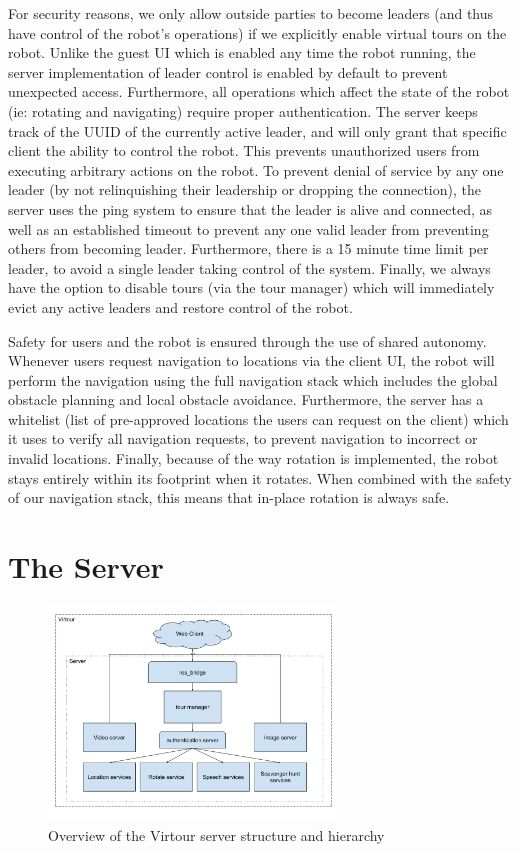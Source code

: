 \documentclass[
  oneside,
  11pt, a4paper,
  footinclude=true,
  headinclude=true,
  cleardoublepage=empty
]{article}
\begin{document}
For security reasons, we only allow outside parties to become leaders (and thus
have control of the robot's operations) if we explicitly enable virtual tours
on the robot. Unlike the guest UI which is enabled any time the robot running,
the server implementation of leader control is enabled by default to prevent
unexpected access. Furthermore, all operations which affect the state of the
robot (ie: rotating and navigating) require proper authentication. The server
keeps track of the UUID of the currently active leader, and will only grant
that specific client the ability to control the robot. This prevents
unauthorized users from executing arbitrary actions on the robot. To prevent
denial of service by any one leader (by not relinquishing their leadership or
dropping the connection), the server uses the ping system to ensure that the
leader is alive and connected, as well as an established timeout to prevent any
one valid leader from preventing others from becoming leader. Furthermore,
there is a 15 minute time limit per leader, to avoid a single leader taking
control of the system. Finally, we always have the option to disable tours (via
the tour manager) which will immediately evict any active leaders and restore
control of the robot.

Safety for users and the robot is ensured through the use of shared autonomy.
Whenever users request navigation to locations via the client UI, the robot
will perform the navigation using the full navigation stack which includes the
global obstacle planning and local obstacle avoidance. Furthermore, the server
has a whitelist (list of pre-approved locations the users can request on the
client) which it uses to verify all navigation requests, to prevent navigation
to incorrect or invalid locations. Finally, because of the way rotation is
implemented, the robot stays entirely within its footprint when it rotates.
When combined with the safety of our navigation stack, this means that in-place
rotation is always safe.


\section{The Server}\label{sec:server}

\begin{figure}
  \centering
  \includegraphics[width=3in]{virtour_server}
  \caption{Overview of the Virtour server structure and hierarchy}
  \label{fig:server}
\end{figure}
\end{document}

